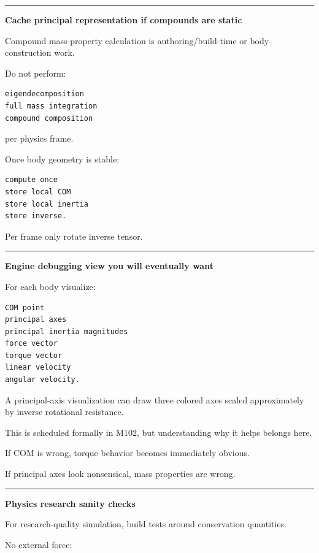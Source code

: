 \begin{center}\rule{0.5\linewidth}{0.5pt}\end{center}

\textbf{Cache principal representation if compounds are static}

Compound mass-property calculation is authoring/build-time or body-construction work.

Do not perform:

\begin{verbatim}
eigendecomposition
full mass integration
compound composition
\end{verbatim}

per physics frame.

Once body geometry is stable:

\begin{verbatim}
compute once
store local COM
store local inertia
store inverse.
\end{verbatim}

Per frame only rotate inverse tensor.

\begin{center}\rule{0.5\linewidth}{0.5pt}\end{center}

\textbf{Engine debugging view you will eventually want}

For each body visualize:

\begin{verbatim}
COM point
principal axes
principal inertia magnitudes
force vector
torque vector
linear velocity
angular velocity.
\end{verbatim}

A principal-axis visualization can draw three colored axes scaled approximately by inverse rotational resistance.

This is scheduled formally in M102, but understanding why it helps belongs here.

If COM is wrong, torque behavior becomes immediately obvious.

If principal axes look nonsensical, mass properties are wrong.

\begin{center}\rule{0.5\linewidth}{0.5pt}\end{center}

\textbf{Physics research sanity checks}

For research-quality simulation, build tests around conservation quantities.

No external force:

